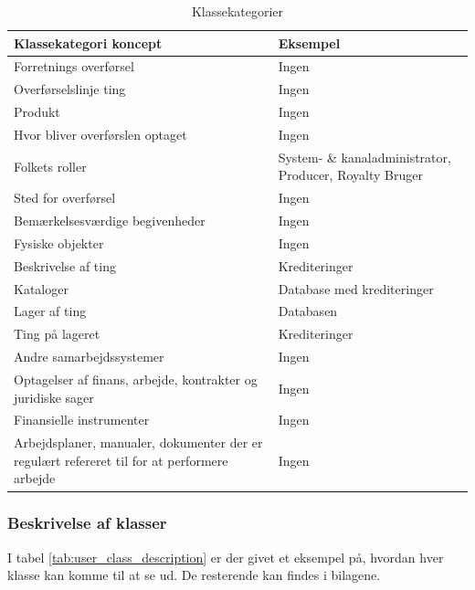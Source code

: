 \begin{table}[H]
    \begin{tabularx}{\textwidth}{|>{\RaggedRight}X|>{\RaggedRight}X|}
        \hline
        \textbf{Klassekategori koncept} & \textbf{Eksempel} \\
        \hline
        Forretnings overførsel & Ingen\\
        \hline
        Overførselslinje ting & Ingen\\
        \hline
        Produkt & Ingen \\
        \hline
        Hvor bliver overførslen optaget  & Ingen \\
        \hline
        Folkets roller & System- \& kanaladministrator, Producer, Royalty Bruger\\
        \hline
        Sted for overførsel & Ingen \\
        \hline
        Bemærkelsesværdige begivenheder & Ingen \\
        \hline
        Fysiske objekter & Ingen \\
        \hline
        Beskrivelse af ting & Krediteringer\\
        \hline
        Kataloger & Database med krediteringer\\
        \hline
        Lager af ting & Databasen\\
        \hline
        Ting på lageret & Krediteringer\\
        \hline
        Andre samarbejdssystemer & Ingen\\
        \hline
        Optagelser af finans, arbejde, kontrakter og juridiske sager & Ingen \\
        \hline
        Finansielle instrumenter & Ingen\\
        \hline
        Arbejdsplaner, manualer, dokumenter der er regulært refereret til for at performere arbejde & Ingen\\
        \hline
    \end{tabularx}
    \caption{Klassekategorier}
    \label{table:class_categories}
\end{table}

\subsubsection{Beskrivelse af klasser}
I tabel \ref{tab:user_class_description} er der givet et eksempel på, hvordan hver klasse kan komme til at se ud. De resterende kan findes i bilagene.
 
